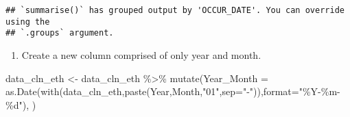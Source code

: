 \documentclass[
]{article}
\newenvironment{Shaded}{\begin{snugshade}}{\end{snugshade}}
\newcommand{\AttributeTok}[1]{\textcolor[rgb]{0.77,0.63,0.00}{#1}}
\newcommand{\ConstantTok}[1]{\textcolor[rgb]{0.00,0.00,0.00}{#1}}
\newcommand{\FunctionTok}[1]{\textcolor[rgb]{0.00,0.00,0.00}{#1}}
\newcommand{\NormalTok}[1]{#1}
\newcommand{\OtherTok}[1]{\textcolor[rgb]{0.56,0.35,0.01}{#1}}
\newcommand{\SpecialCharTok}[1]{\textcolor[rgb]{0.00,0.00,0.00}{#1}}
\newcommand{\StringTok}[1]{\textcolor[rgb]{0.31,0.60,0.02}{#1}}
\providecommand{\tightlist}{%
  \setlength{\itemsep}{0pt}\setlength{\parskip}{0pt}}
\begin{document}
\begin{Shaded}
\end{Shaded}

\begin{verbatim}
## `summarise()` has grouped output by 'OCCUR_DATE'. You can override using the
## `.groups` argument.
\end{verbatim}

\begin{enumerate}
\def\labelenumi{\arabic{enumi})}
\setcounter{enumi}{1}
\tightlist
\item
  Create a new column comprised of only year and month.
\end{enumerate}

\begin{Shaded}
\begin{Highlighting}[]
\NormalTok{data\_cln\_eth }\OtherTok{\textless{}{-}}\NormalTok{ data\_cln\_eth }\SpecialCharTok{\%\textgreater{}\%} \FunctionTok{mutate}\NormalTok{(}\AttributeTok{Year\_Month =} \FunctionTok{as.Date}\NormalTok{(}\FunctionTok{with}\NormalTok{(data\_cln\_eth,}\FunctionTok{paste}\NormalTok{(Year,Month,}\StringTok{"01"}\NormalTok{,}\AttributeTok{sep=}\StringTok{"{-}"}\NormalTok{)),}\AttributeTok{format=}\StringTok{"\%Y{-}\%m{-}\%d"}\NormalTok{), )}
\end{Highlighting}
\end{Shaded}
\end{document}
